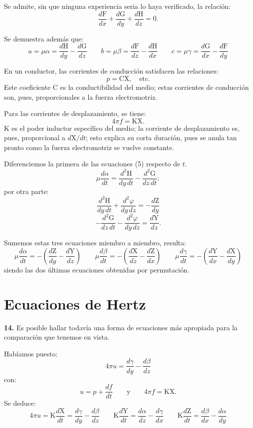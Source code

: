 Se admite, sin que ninguna experiencia seria lo haya verificado, la
relación:
\[
\frac{d\mathrm{F}}{dx}+\frac{d\mathrm{G}}{dy}+\frac{d\mathrm{H}}{dz}=0.
\]

Se demuestra además que:
\begin{equation}
a=\mu\alpha=\frac{d\mathrm{H}}{dy}-\frac{d\mathrm{G}}{dz}\qquad
b=\mu\beta=\frac{d\mathrm{F}}{dz}-\frac{d\mathrm{H}}{dx}\qquad
c=\mu\gamma=\frac{d\mathrm{G}}{dx}-\frac{d\mathrm{F}}{dy}
\end{equation}

En un conductor, las corrientes de conducción satisfacen las relaciones:
\[
p=\mathrm{C}\mathrm{X},\quad\text{etc.}
\]
Este coeficiente $\mathrm{C}$ es la conductibilidad del medio; estas
corrientes de conducción son, pues, proporcionales a la fuerza
electromotriz.

Para las corrientes de desplazamiento, se tiene:
\[
4\pi f=\mathrm{K}\mathrm{X}.
\]
$\mathrm{K}$ es el poder inductor específico del medio; la corriente de
desplazamiento es, pues, proporcional a $d\mathrm{X}/dt$; esto explica su
corta duración, pues se anula tan pronto como la fuerza electromotriz se
vuelve constante.

Diferenciemos la primera de las ecuaciones (5) respecto de $t$.
\[
\mu\frac{d\alpha}{dt}=\frac{d^2\mathrm{H}}{dy\,dt}-\frac{d^2\mathrm{G}}{dz\,dt};
\]
por otra parte:
\[
\frac{d^2\mathrm{H}}{dy\,dt}+\frac{d^2\varphi}{dy\,dz}=-\frac{d\mathrm{Z}}{dy}
\]
\[
-\frac{d^2\mathrm{G}}{dz\,dt}-\frac{d^2\varphi}{dy\,dz}=\frac{d\mathrm{Y}}{dz}.
\]

Sumemos estas tres ecuaciones miembro a miembro, resulta:
\begin{equation}
\mu\frac{d\alpha}{dt}=-\left(\frac{d\mathrm{Z}}{dy}-\frac{d\mathrm{Y}}{dz}\right)\qquad
\mu\frac{d\beta}{dt}=-\left(\frac{d\mathrm{X}}{dz}-\frac{d\mathrm{Z}}{dx}\right)\qquad
\mu\frac{d\gamma}{dt}=-\left(\frac{d\mathrm{Y}}{dx}-\frac{d\mathrm{X}}{dy}\right)
\end{equation}
siendo las dos últimas ecuaciones obtenidas por permutación.

\section{Ecuaciones de Hertz}

\noindent\textbf{14.} Es posible hallar todavía una forma de ecuaciones más
apropiada para la comparación que tenemos en vista.

Habíamos puesto:
\[
4\pi u=\frac{d\gamma}{dy}-\frac{d\beta}{dz}
\]
con:
\[
u=p+\frac{df}{dt}\qquad\text{y}\qquad 4\pi f=\mathrm{K}\mathrm{X}.
\]
Se deduce:
\begin{equation}
4\pi u=\mathrm{K}\frac{d\mathrm{X}}{dt}=\frac{d\gamma}{dy}-\frac{d\beta}{dz}\qquad
\mathrm{K}\frac{d\mathrm{Y}}{dt}=\frac{d\alpha}{dz}-\frac{d\gamma}{dx}\qquad
\mathrm{K}\frac{d\mathrm{Z}}{dt}=\frac{d\beta}{dx}-\frac{d\alpha}{dy}
\end{equation}

